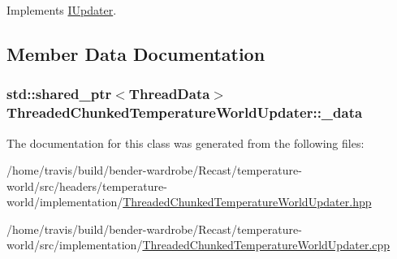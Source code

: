 Implements \hyperlink{class_i_updater_a08a8af34922a2320f5ab5617e6e31276}{I\-Updater}.



\subsection{Member Data Documentation}
\hypertarget{class_threaded_chunked_temperature_world_updater_ac1ccf89503ccb9f4aea1437188246503}{
\subsubsection[{\-\_\-data}]{\setlength{\rightskip}{0pt plus 5cm}std\-::shared\-\_\-ptr$<${\bf Thread\-Data}$>$ Threaded\-Chunked\-Temperature\-World\-Updater\-::\-\_\-data\hspace{0.3cm}{\ttfamily [protected]}}}\label{class_threaded_chunked_temperature_world_updater_ac1ccf89503ccb9f4aea1437188246503}


The documentation for this class was generated from the following files\-:\begin{DoxyCompactItemize}
\item 
/home/travis/build/bender-\/wardrobe/\-Recast/temperature-\/world/src/headers/temperature-\/world/implementation/\hyperlink{_threaded_chunked_temperature_world_updater_8hpp}{Threaded\-Chunked\-Temperature\-World\-Updater.\-hpp}\item 
/home/travis/build/bender-\/wardrobe/\-Recast/temperature-\/world/src/implementation/\hyperlink{_threaded_chunked_temperature_world_updater_8cpp}{Threaded\-Chunked\-Temperature\-World\-Updater.\-cpp}\end{DoxyCompactItemize}
